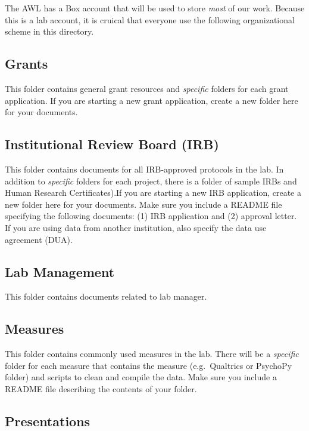 \documentclass[]{book}
\begin{document}
The AWL has a Box account that will be used to store \emph{most} of our work. Because this is a lab account, it is cruical that everyone use the following organizational scheme in this directory.

\hypertarget{grants}{%
\subsection{Grants}\label{grants}}

This folder contains general grant resources and \emph{specific} folders for each grant application. If you are starting a new grant application, create a new folder here for your documents.

\hypertarget{institutional-review-board-irb}{%
\subsection{Institutional Review Board (IRB)}\label{institutional-review-board-irb}}

This folder contains documents for all IRB-approved protocols in the lab. In addition to \emph{specific} folders for each project, there is a folder of sample IRBs and Human Research Certificates).If you are starting a new IRB application, create a new folder here for your documents. Make sure you include a README file specifying the following documents: (1) IRB application and (2) approval letter. If you are using data from another institution, also specify the data use agreement (DUA).

\hypertarget{lab-management}{%
\subsection{Lab Management}\label{lab-management}}

This folder contains documents related to lab manager.

\hypertarget{measures}{%
\subsection{Measures}\label{measures}}

This folder contains commonly used measures in the lab. There will be a \emph{specific} folder for each measure that contains the measure (e.g.~Qualtrics or PsychoPy folder) and scripts to clean and compile the data. Make sure you include a README file describing the contents of your folder.

\hypertarget{presentations}{%
\subsection{Presentations}\label{presentations}}
\end{document}
